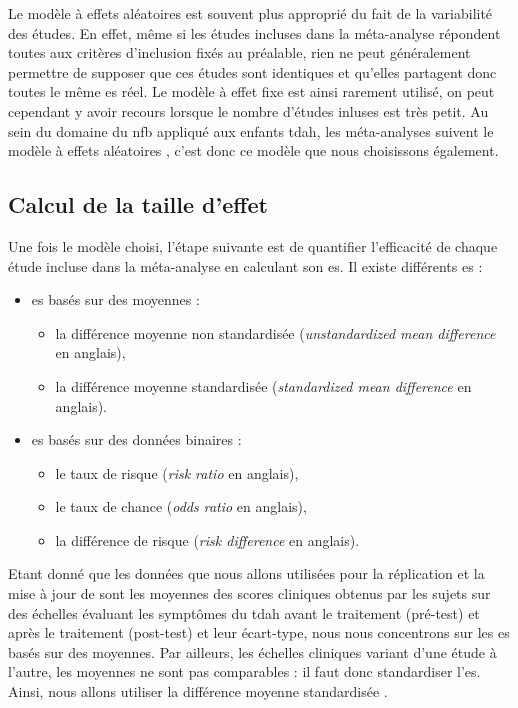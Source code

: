 Le modèle à effets aléatoires est souvent plus approprié du fait de la variabilité des études. En effet, même si les études incluses dans la méta-analyse 
répondent toutes aux critères d'inclusion fixés au préalable, rien ne peut généralement permettre de supposer que ces études sont identiques et qu'elles 
partagent donc toutes le même \gls{es} réel. Le modèle à effet fixe est ainsi rarement utilisé, on peut cependant y avoir recours lorsque le nombre d'études inluses 
est très petit. Au sein du domaine du \gls{nfb} appliqué aux enfants \gls{tdah}, les méta-analyses suivent le modèle à effets aléatoires 
\citep{Cortese2016, Micoulaud2014}, c'est donc ce modèle que nous choisissons également.

\subsection{Calcul de la taille d'effet}

Une fois le modèle choisi, l'étape suivante est de quantifier l'efficacité de chaque étude incluse dans la méta-analyse en calculant son \gls{es}. 
Il existe différents \gls{es} \citep{Borenstein2009} :
\renewcommand{\labelitemi}{$\bullet$}
\renewcommand{\labelitemii}{$\cdot$}
\begin{itemize}
\item \gls{es} basés sur des moyennes :
\begin{itemize}
    \item la différence moyenne non standardisée (\textit{unstandardized mean difference} en anglais),
    \item la différence moyenne standardisée (\textit{standardized mean difference} en anglais).
\end{itemize}
\item \gls{es} basés sur des données binaires :
\begin{itemize}
    \item le taux de risque (\textit{risk ratio} en anglais),
    \item le taux de chance (\textit{odds ratio} en anglais),
		\item la différence de risque (\textit{risk difference} en anglais).
\end{itemize}
\end{itemize}

Etant donné que les données que nous allons utilisées pour la réplication et la mise à jour de \citet{Cortese2016} sont les moyennes des 
scores cliniques obtenus par les sujets sur des échelles évaluant les symptômes du \gls{tdah} avant le traitement (pré-test) et 
après le traitement (post-test) et leur écart-type, nous nous concentrons sur 
les \gls{es} basés sur des moyennes. Par ailleurs, les échelles cliniques variant 
d'une étude à l'autre, les moyennes ne sont pas comparables : il faut donc standardiser l'\gls{es}. 
Ainsi, nous allons utiliser la différence moyenne standardisée \citep{Cortese2016, Micoulaud2014}.

